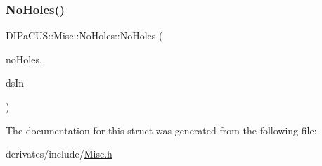 \subsubsection{\texorpdfstring{No\+Holes()}{NoHoles()}}
{\footnotesize\ttfamily D\+I\+Pa\+C\+U\+S\+::\+Misc\+::\+No\+Holes\+::\+No\+Holes (\begin{DoxyParamCaption}\item[{\mbox{\hyperlink{structDIPaCUS_1_1Misc_1_1NoHoles_aea4bec251425e3c31593c97ec33a9dda}{Digital\+Set}} \&}]{no\+Holes,  }\item[{const \mbox{\hyperlink{structDIPaCUS_1_1Misc_1_1NoHoles_aea4bec251425e3c31593c97ec33a9dda}{Digital\+Set}} \&}]{ds\+In }\end{DoxyParamCaption})\hspace{0.3cm}{\ttfamily [inline]}}



The documentation for this struct was generated from the following file\+:\begin{DoxyCompactItemize}
\item 
derivates/include/\mbox{\hyperlink{Misc_8h}{Misc.\+h}}\end{DoxyCompactItemize}
